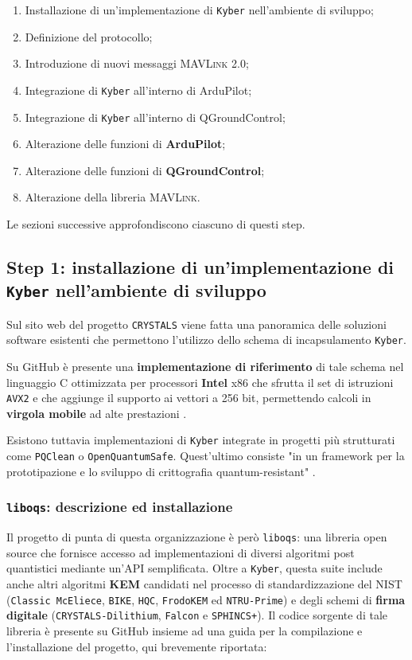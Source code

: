 \documentclass[a4paper, 12pt, oneside]{article}
\theoremstyle{definition}
\begin{document}
\begin{enumerate}
    \item Installazione di un'implementazione di \texttt{Kyber} nell'ambiente di sviluppo;
    \item Definizione del protocollo;
    \item Introduzione di nuovi messaggi \textsc{MAVLink} 2.0;
    \item Integrazione di \texttt{Kyber} all'interno di ArduPilot;
    \item Integrazione di \texttt{Kyber} all'interno di QGroundControl;
    \item Alterazione delle funzioni di \textbf{ArduPilot};
    \item Alterazione delle funzioni di \textbf{QGroundControl};
    \item Alterazione della libreria \textsc{MAVLink}.
\end{enumerate}

Le sezioni successive approfondiscono ciascuno di questi step.

\subsection{Step 1: installazione di un'implementazione di \texttt{Kyber} nell'ambiente di sviluppo}
Sul sito web del progetto \texttt{CRYSTALS} \cite{crystals-software} viene fatta una panoramica delle soluzioni software esistenti che permettono l'utilizzo dello schema di incapsulamento \texttt{Kyber}.

Su GitHub è presente una \textbf{implementazione di riferimento} \cite{kyber-reference} di tale schema nel linguaggio C ottimizzata per processori \textbf{Intel} x86 che sfrutta il set di istruzioni \texttt{AVX2} e che aggiunge il supporto ai vettori a 256 bit, permettendo calcoli in \textbf{virgola mobile} ad alte prestazioni \cite{intel-avx2}.

Esistono tuttavia implementazioni di \texttt{Kyber} integrate in progetti più strutturati come \texttt{PQClean} o \texttt{OpenQuantumSafe}. Quest'ultimo consiste "in un framework per la prototipazione e lo sviluppo di crittografia quantum-resistant" \cite{oqs}.

\subsubsection{\texttt{liboqs}: descrizione ed installazione}
Il progetto di punta di questa organizzazione è però \texttt{liboqs}: una libreria open source che fornisce accesso ad implementazioni di diversi algoritmi post quantistici mediante un'API semplificata. Oltre a \texttt{Kyber}, questa suite include anche altri algoritmi \cite{liboqs-algorithms} \textbf{KEM} candidati nel processo di standardizzazione del NIST (\texttt{Classic McEliece}, \texttt{BIKE}, \texttt{HQC}, \texttt{FrodoKEM} ed \texttt{NTRU-Prime}) e degli schemi di \textbf{firma digitale} (\texttt{CRYSTALS-Dilithium}, \texttt{Falcon} e \texttt{SPHINCS+}). Il codice sorgente di tale libreria è presente su GitHub \cite{liboqs-github} insieme ad una guida per la compilazione e l'installazione del progetto, qui brevemente riportata:
\end{document}
